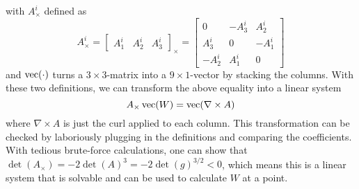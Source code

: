\documentclass[../thesis.tex]{subfiles}
\begin{document}
with $A^i_{\times}$ defined as
$$A^i_{\times} = \begin{bmatrix}
  A^i_1 & A^i_2 & A^i_3
\end{bmatrix}_{\times} =
\begin{bmatrix}
  0 & -A^i_3 & A^i_2 \\
  A^i_3 & 0 & -A^i_1 \\
  -A^i_2 & A^i_1 & 0
\end{bmatrix}$$ and $\operatorname{vec}(\cdot)$ turns a $3\times3$-matrix into a $9\times1$-vector by stacking the columns.
With these two definitions, we can transform the above equality into a linear system
\begin{equation}
  A_{\times} \operatorname{vec}(W) = \operatorname{vec} (\nabla \times A)
\end{equation}\label{eq:linearsystem}
where $\nabla \times A$ is just the curl applied to each column. This transformation can be checked by laboriously plugging in the definitions and comparing the coefficients.
With tedious brute-force calculations, one can show that $\det(A_{\times})=-2\det(A)^3=-2\det(g)^{3/2}<0$, which
means this is a linear system that is solvable and can be used to calculate $W$ at a point.
\end{document}
